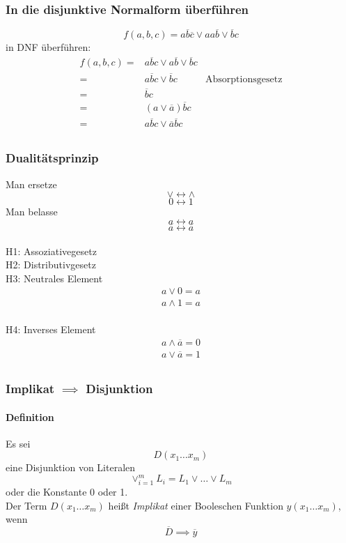\documentclass[a4paper]{scrartcl}
\begin{document}
			\subsubsection{In die disjunktive Normalform überführen}
			\[ f(a, b, c) = a \overline{b} \overline{c} \vee aa \overline{b} \vee \overline{b} c \]
			in DNF überführen:\\
			\begin{align*}
				f(a, b, c) =& a \overline{b} c \vee a \overline{b} \vee \overline{b} c \\
				=& a \overline{b} c \vee \overline{b} c & \text{Absorptionsgesetz} \\
				=& \overline{b} c \\
				=& (a \vee \overline{a}) \overline{b} c \\
				=& a  \overline{b} c \vee  \overline{a} \overline{b} c \\
			\end{align*}
			
			\subsubsection{Dualitätsprinzip}
			\label{subsubsec:dualitaetsprinzip}
			Man ersetze 
			\[ \vee \leftrightarrow \wedge \]
			\[ 0 \leftrightarrow 1 \]
			Man belasse
			\[ a  \leftrightarrow a \]
			\[ \overline{a} \leftrightarrow \overline{a}  \]\\ 
			H1: Assoziativegesetz\\
			
			H2: Distributivgesetz\\
			
			H3: Neutrales Element
			\begin{align*}
				a \vee 0 = a \\
				a \wedge 1 = a\\
			\end{align*}
			
			H4: Inverses Element
			\begin{align*}
				a \wedge \overline{a} = 0\\
				a \vee \overline{a} = 1 \\
			\end{align*}
			
			\subsubsection{Implikat \( \implies \) Disjunktion }
			\paragraph{Definition}
			Es sei \[D(x_1 \dots x_m)\] eine Disjunktion von Literalen \[ \vee_{i=1}^{m} L_i = L_1 \vee \dots \vee L_m  \]
			oder die Konstante 0 oder 1.\\
			Der Term \(D(x_1 \dots x_m)\) heißt \emph{Implikat} einer Booleschen Funktion \( y( x_1 \dots x_m) \), wenn \[ \overline{D} \implies \overline{y} \]
			
\end{document}
